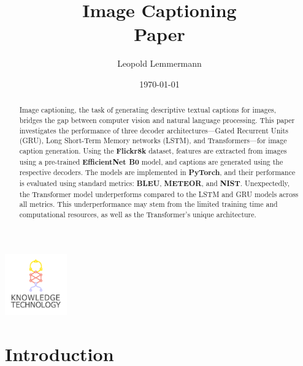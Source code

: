 \documentclass[12pt]{article}
\newcommand{\trauthor}{Leopold Lemmermann}
\newcommand{\trtype}{Paper}
\newcommand{\trtitle}{Image Captioning}
\newcommand{\trdate}{\today}
\theoremstyle{plain}
\theoremstyle{definition}
\theoremstyle{remark}
\begin{document}
\renewcommand{\headheight}{14.5pt}

\fancyhead{}
\fancyhead[CO]{\trtitle}



\title{\trtitle\\[0.2cm]{\normalsize\trtype}}
\author{\trauthor}
\date{\trdate}
\maketitle

\thispagestyle{empty}

\begin{center}
    \includegraphics[width=0.2\textwidth]{res/wtmicon.pdf}
\end{center}

\begin{abstract}
    Image captioning, the task of generating descriptive textual captions for images, bridges the gap between computer vision and natural language processing.
    This paper investigates the performance of three decoder architectures---Gated Recurrent Units (GRU), Long Short-Term Memory networks (LSTM), and Transformers---for image caption generation.
    Using the \textbf{Flickr8k} dataset, features are extracted from images using a pre-trained \textbf{EfficientNet B0} model, and captions are generated using the respective decoders.
    The models are implemented in \textbf{PyTorch}, and their performance is evaluated using standard metrics: \textbf{BLEU}, \textbf{METEOR}, and \textbf{NIST}.
    Unexpectedly, the Transformer model underperforms compared to the LSTM and GRU models across all metrics. This underperformance may stem from the limited training time and computational resources, as well as the Transformer's unique architecture.
\end{abstract}

\setcounter{tocdepth}{1}
\tableofcontents
\newpage
{}



\section{Introduction}
\label{sec:introduction}
\end{document}
